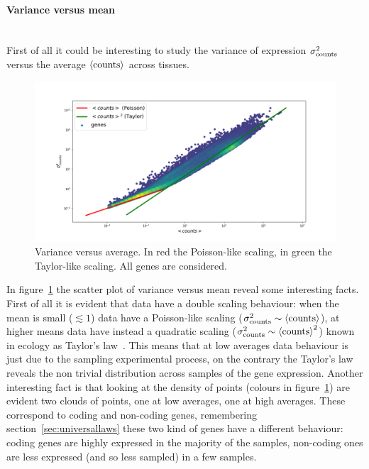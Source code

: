 \paragraph{Variance versus mean}\mbox{}\\
First of all it could be interesting to study the variance of expression $\sigma^2_{\mathrm{counts}}$ versus 
the average $\left\langle \mathrm{counts}\right\rangle$ across tissues.
\begin{figure}[htb!]
    \centering
    \includegraphics[width=0.9\linewidth]{pictures/scalinglaws/gtex/allgenes/varmean_loglog.png}
    \caption{Variance versus average. In \textcolor{pythonred}{red} the Poisson-like scaling, in \textcolor{pythongreen}{green} the Taylor-like scaling. All genes are considered.}
    \label{fig:scalinglaws/gtex/allgenes/varmean_loglog_density}
\end{figure}
In figure~\ref{fig:scalinglaws/gtex/allgenes/varmean_loglog_density} the scatter plot of variance versus mean reveal some interesting facts.
First of all it is evident that data have a double scaling behaviour: when the mean is small ($\lesssim 1$) data have a Poisson-like scaling ($\sigma^2_{\mathrm{counts}} \sim \left\langle \mathrm{counts}\right\rangle$), at higher means data have instead a quadratic scaling ($\sigma^2_{\mathrm{counts}} \sim \left\langle \mathrm{counts}\right\rangle^2$) known in ecology as Taylor's law~\cite{Eisler2008}. This means that at low averages data behaviour is just due to the sampling experimental process, on the contrary the Taylor's law reveals the non trivial distribution across samples of the gene expression.
Another interesting fact is that looking at the density of points (colours in figure~\ref{fig:scalinglaws/gtex/allgenes/varmean_loglog_density}) are evident two clouds of points, one at low averages, one at high averages. These correspond to coding and non-coding genes, remembering section~\ref{sec:universallaws} these two kind of genes have a different behaviour: coding genes are highly expressed in the majority of the samples, non-coding ones are less expressed (and so less sampled) in a few samples. 

